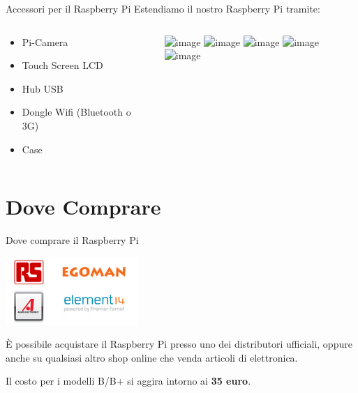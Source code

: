 \documentclass[xcolor=svgnames,11pt]{beamer}
\begin{document}
\begin{frame}[fragile]{Accessori per il Raspberry Pi}
Estendiamo il nostro Raspberry Pi tramite:
\vspace{1cm}

\begin{columns}
    \begin{column}{0.5\textwidth}
	\begin{itemize}
	\item Pi-Camera
	\pause
	\item Touch Screen LCD
	\pause
	\item Hub USB
	\pause
	\item Dongle Wifi (Bluetooth o 3G)
	\pause
	\item Case
	\end{itemize}
    \end{column}
    \begin{column}{0.5\textwidth}
    \begin{center}
      \includegraphics<1>[height=4cm]{picamera.png}
      \includegraphics<2>[height=4cm]{pimonitor.png}
      \includegraphics<3>[height=4cm]{pihub.png}
      \includegraphics<4>[height=4cm]{piwifi.png}
      \includegraphics<5>[height=4cm]{picase.png}            
    \end{center}
    \end{column}
  \end{columns}
\end{frame}

\section{Dove Comprare}

\begin{frame}{Dove comprare il Raspberry Pi}

\begin{center}
\includegraphics[width=5cm]{wherebuy.png}
\end{center}

\`E possibile acquistare il Raspberry Pi presso uno dei distributori ufficiali, oppure anche su qualsiasi altro shop online che venda articoli di elettronica.

\medskip

Il costo per i modelli B/B+ si aggira intorno ai \textbf{35 euro}.

\end{frame}
\end{document}
